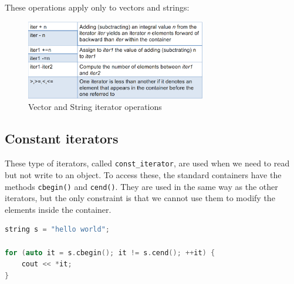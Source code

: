 These operations apply only to vectors and strings:

\begin{figure}[H]
    \centering
    \includegraphics[width=0.7\textwidth]{figures/image_vec_str_it_op.png}
    \caption{Vector and String iterator operations}
    \label{fig:vec_str_it_op}
\end{figure}

\subsection{Constant iterators}

These type of iterators, called \texttt{const\_iterator}, are used when we 
need to read but not write to an object. To access these, the standard containers
have the methods \texttt{cbegin()} and \texttt{cend()}. They are used in the same
way as the other iterators, but the only constraint is that we cannot use them to
modify the elements inside the container.\\

\begin{lstlisting}[language=C++]
string s = "hello world";

for (auto it = s.cbegin(); it != s.cend(); ++it) {
    cout << *it;
}
\end{lstlisting}